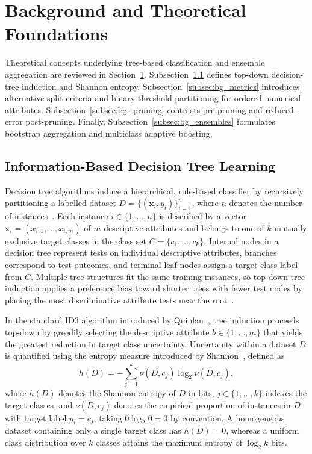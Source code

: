\section{Background and Theoretical Foundations}
\label{sec:background}

Theoretical concepts underlying tree-based classification and ensemble aggregation are reviewed in Section~\ref{sec:background}. Subsection~\ref{subsec:bg_trees} defines top-down decision-tree induction and Shannon entropy. Subsection~\ref{subsec:bg_metrics} introduces alternative split criteria and binary threshold partitioning for ordered numerical attributes. Subsection~\ref{subsec:bg_pruning} contrasts pre-pruning and reduced-error post-pruning. Finally, Subsection~\ref{subsec:bg_ensembles} formulates bootstrap aggregation and multiclass adaptive boosting.

\subsection{Information-Based Decision Tree Learning}
\label{subsec:bg_trees}
Decision tree algorithms induce a hierarchical, rule-based classifier by recursively partitioning a labelled dataset $D = \{(\mathbf{x}_i, y_i)\}_{i=1}^n$, where $n$ denotes the number of instances~\cite{Kelleher2020,Quinlan1986}. Each instance $i \in \{1, \dots, n\}$ is described by a vector $\mathbf{x}_i = (x_{i,1}, \dots, x_{i,m})$ of $m$ descriptive attributes and belongs to one of $k$ mutually exclusive target classes in the class set $C = \{c_1, \dots, c_k\}$. Internal nodes in a decision tree represent tests on individual descriptive attributes, branches correspond to test outcomes, and terminal leaf nodes assign a target class label from $C$. Multiple tree structures fit the same training instances, so top-down tree induction applies a preference bias toward shorter trees with fewer test nodes by placing the most discriminative attribute tests near the root~\cite{Kelleher2020}.

In the standard ID3 algorithm introduced by Quinlan~\cite{Quinlan1986}, tree induction proceeds top-down by greedily selecting the descriptive attribute $b \in \{1, \dots, m\}$ that yields the greatest reduction in target class uncertainty. Uncertainty within a dataset $D$ is quantified using the entropy measure introduced by Shannon~\cite{Shannon1948}, defined as
\begin{equation}
    h(D) = - \sum_{j=1}^k \nu(D, c_j) \log_2 \nu(D, c_j),
    \label{eq:entropy}
\end{equation}
where $h(D)$ denotes the Shannon entropy of $D$ in bits, $j \in \{1, \dots, k\}$ indexes the target classes, and $\nu(D, c_j)$ denotes the empirical proportion of instances in $D$ with target label $y_i = c_j$, taking $0 \log_2 0 = 0$ by convention. A homogeneous dataset containing only a single target class has $h(D) = 0$, whereas a uniform class distribution over $k$ classes attains the maximum entropy of $\log_2 k$ bits.

